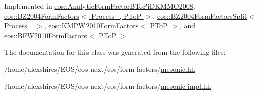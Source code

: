 Implemented in \hyperlink{classeos_1_1AnalyticFormFactorBToPiDKMMO2008_aa3903289904f6e732bc9094f3826d3be}{eos::AnalyticFormFactorBToPiDKMMO2008}, \hyperlink{classeos_1_1BZ2004FormFactors_3_01Process___00_01PToP_01_4_a1721a47e9e515d8301e0611cb82398aa}{eos::BZ2004FormFactors$<$ Process\_\-, PToP $>$}, \hyperlink{classeos_1_1BZ2004FormFactorsSplit_a395cb136ff1d486d5a0b0a2c0d5f7d10}{eos::BZ2004FormFactorsSplit$<$ Process\_\- $>$}, \hyperlink{classeos_1_1KMPW2010FormFactors_3_01PToP_01_4_ac679f7283ec7f07e47f31629fe412344}{eos::KMPW2010FormFactors$<$ PToP $>$}, and \hyperlink{classeos_1_1BFW2010FormFactors_3_01PToP_01_4_a37ffe94ba17d4e2b68ec11b2960f97b7}{eos::BFW2010FormFactors$<$ PToP $>$}.

The documentation for this class was generated from the following files:\begin{DoxyCompactItemize}
\item 
/home/alexshires/EOS/eos-\/next/eos/form-\/factors/\hyperlink{mesonic_8hh}{mesonic.hh}\item 
/home/alexshires/EOS/eos-\/next/eos/form-\/factors/\hyperlink{mesonic-impl_8hh}{mesonic-\/impl.hh}\end{DoxyCompactItemize}

